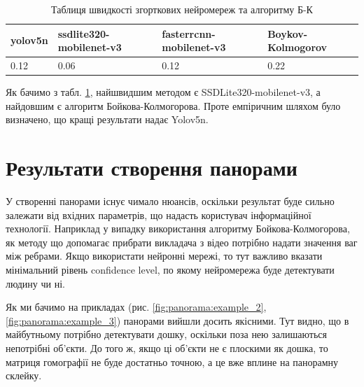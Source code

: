 \begin{table}[H]
    \begin{center}
        \caption{Таблиця швидкості згорткових нейромереж та алгоритму Б-К}
        \label{tab:speed_methods_table}
        \begin{tabular}{|p{1.2in} | p{1.2in} | p{1.2in} | p{1.2in}|}
            \hline
            \textbf{yolov5n} & \textbf{ssdlite320-mobilenet-v3} & \textbf{fasterrcnn-mobilenet-v3} & \textbf{Boykov-Kolmogorov} \\
            \hline
            0.12             & 0.06                             & 0.12                             & 0.22                       \\
            \hline
        \end{tabular}
    \end{center}
\end{table}



Як бачимо з табл. \ref{tab:speed_methods_table}, найшвидшим методом є SSDLite320-mobilenet-v3,
а найдовшим є алгоритм Бойкова-Колмогорова.
Проте емпіричним шляхом було визначено, що кращі результати надає Yolov5n.

\section{Результати створення панорами}

У створенні панорами існує чимало нюансів, оскільки результат буде сильно
залежати від вхідних параметрів, що надасть користувач інформаційної технології.
Наприклад у випадку використання алгоритму Бойкова-Колмогорова, як методу що допомагає
прибрати викладача з відео потрібно надати значення ваг між ребрами. Якщо використати
нейронні мережі, то тут важливо вказати мінімальний рівень confidence level, по якому нейромережа
буде детектувати людину чи ні.

Як ми бачимо на прикладах (рис. \ref{fig:panorama:example_2}, \ref{fig:panorama:example_3}) панорами
вийшли досить якісними. Тут видно, що в майбутньому потрібно детектувати дошку, оскільки поза нею
залишаються непотрібні об'єкти. До того ж, якщо ці об'єкти не є плоскими як дошка, то
матриця гомографії не буде достатньо точною, а це вже вплине на панорамну склейку.

